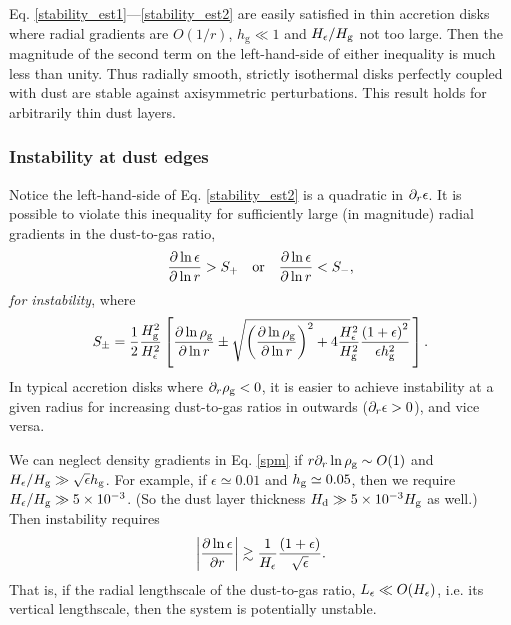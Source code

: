 Eq. \ref{stability_est1}---\ref{stability_est2} are easily satisfied
in thin accretion disks where radial gradients are $O(1/r)$, 
$h_\mathrm{g}\ll 1$ and $H_\epsilon/H_\mathrm{g}$ not too
large.  Then the
magnitude of the second term on the left-hand-side  of either
inequality is much less than unity. Thus radially smooth, strictly
isothermal disks perfectly coupled with dust are stable against
axisymmetric perturbations. This result holds for arbitrarily thin
dust layers. 


\subsubsection{Instability at dust edges}
Notice the left-hand-side of Eq. \ref{stability_est2} is a quadratic in
$\partial_r\epsilon$. It is possible to
violate this inequality for sufficiently large (in magnitude) radial
gradients  in the dust-to-gas ratio, 
\begin{align}
  \frac{\partial\ln{\epsilon}}{\partial\ln{r}} > S_+ \quad \mathrm{or} \quad 
  \frac{\partial\ln{\epsilon}}{\partial\ln{r}} < S_-,
\end{align}
\emph{for instability}, where
\begin{align}\label{spm}
S_\pm = \frac{1}{2}\frac{H_\mathrm{g}^2}{H_\epsilon^2} 
  \left[
  \frac{\partial\ln{\rho_\mathrm{g}}}{\partial\ln{r}} \pm 
  \sqrt{
  \left(\frac{\partial\ln{\rho_\mathrm{g}}}{\partial\ln{r}}\right)^2 + 
  4 \frac{H_\epsilon^2}{H_\mathrm{g}^2}
  \frac{\left(1+\epsilon\right)^2}{\epsilon h_\mathrm{g}^2}
  }
  \,\right]. 
\end{align} 
In typical accretion disks where $\partial_r\rho_\mathrm{g}<0$, it is easier to
achieve instability at a given radius for increasing dust-to-gas
ratios in outwards ($\partial_r\epsilon > 0$), and vice versa.  

We can neglect density gradients in Eq. \ref{spm} 
if $r\partial_r\ln{\rho_\mathrm{g}}\sim O(1)$ and $H_\epsilon/H_\mathrm{g}\gg
\sqrt{\epsilon}h_\mathrm{g}$. For example, if $\epsilon\simeq 0.01$ and
$h_\mathrm{g}\simeq 0.05$, then we require $H_\epsilon/H_\mathrm{g}\gg
5\times10^{-3}$. (So the dust layer thickness $H_\mathrm{d}\gg 5
\times10^{-3}H_\mathrm{g}$ as well.) Then 
instability requires 
\begin{align}\label{dust_edge}
\left|\frac{\partial\ln{\epsilon}}{\partial r}\right| \gtrsim
  \frac{1}{H_\epsilon}\frac{\left(1+\epsilon\right)}{\sqrt{\epsilon}}.
\end{align}
That is, if the radial lengthscale of the dust-to-gas ratio,
$L_\epsilon\ll O(H_\epsilon)$, i.e. its vertical lengthscale,  
then the system is potentially unstable.  

